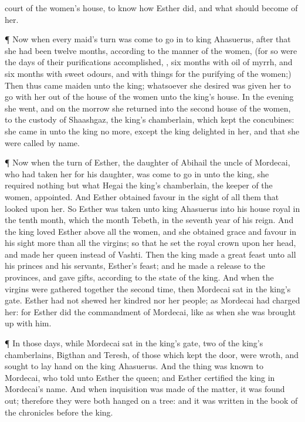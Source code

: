 {court of the
women’s
house, to
know how
Esther
did, and what should
become of her.
\par }{\PP {}¶ Now when every
maid’s
turn was
come to go
in to
king
Ahasuerus,
after that she had been
twelve
months, according to the
manner of the
women, (for so were the
days of their
purifications
accomplished,
{},
six
months with
oil of
myrrh, and
six
months with sweet
odours, and with
{} things for the
purifying of the
women;)
Then thus
came
{}
maiden unto the
king; whatsoever she
desired was
given her to
go with her out of the
house of the
women unto the
king’s
house.
In the
evening she
went, and on the
morrow she
returned into the
second
house of the
women, to the
custody of
Shaashgaz, the
king’s
chamberlain, which
kept the
concubines: she came
in unto the
king no more, except the
king
delighted in her, and that she were
called by
name.
\par }{\PP {}¶ Now when the
turn of
Esther, the
daughter of
Abihail the
uncle of
Mordecai, who had
taken her for his
daughter, was
come to go
in unto the
king, she
required
nothing but what
Hegai the
king’s
chamberlain, the
keeper of the
women,
appointed. And
Esther
obtained
favour in the
sight of all them that
looked upon her.
So
Esther was
taken unto
king
Ahasuerus into his
house
royal in the
tenth
month, which
{} the
month
Tebeth, in the
seventh
year of his
reign.
And the
king
loved
Esther above all the
women, and she
obtained
grace and
favour in his
sight more than all the
virgins; so that he
set the
royal
crown upon her
head, and made her
queen instead of
Vashti.
Then the
king
made a
great
feast unto all his
princes and his
servants,
{}
Esther’s
feast; and he
made a
release to the
provinces, and
gave
gifts, according to the
state of the
king.
And when the
virgins were gathered
together the second
time, then
Mordecai
sat in the
king’s
gate.
Esther had not
{}
shewed her
kindred nor her
people; as
Mordecai had
charged her: for
Esther
did the
commandment of
Mordecai, like as when she was brought
up with him.
\par }{\PP {}¶ In those
days, while
Mordecai
sat in the
king’s
gate,
two of the
king’s
chamberlains,
Bigthan and
Teresh, of those which
kept the
door, were
wroth, and
sought to
lay
hand on the
king
Ahasuerus.
And the
thing was
known to
Mordecai, who
told
{} unto
Esther the
queen; and
Esther
certified the
king
{} in
Mordecai’s
name.
And when
inquisition was made of the
matter, it was found
out; therefore they were
both
hanged on a
tree: and it was
written in the
book of the
chronicles
before the
king.

}
